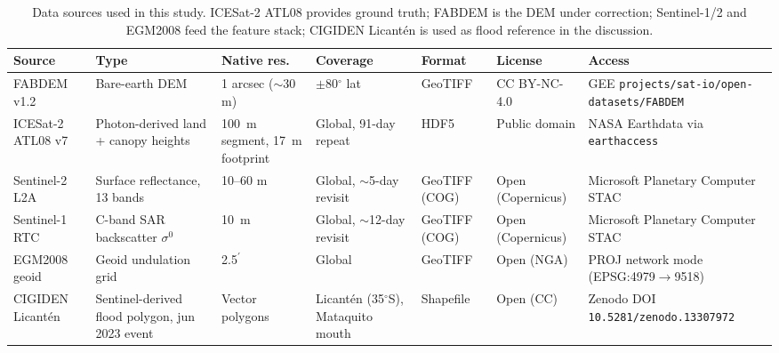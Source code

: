 \begin{table}[t]
\centering
\caption{Data sources used in this study. ICESat-2 ATL08 provides ground truth; FABDEM is the DEM under correction; Sentinel-1/2 and EGM2008 feed the feature stack; CIGIDEN Licant\'en is used as flood reference in the discussion.}
\label{tab:data_sources}
\footnotesize
\begin{tabular}{p{2.4cm}p{3cm}p{2cm}p{2cm}p{1.5cm}p{1.5cm}p{3cm}}
\toprule
\textbf{Source} & \textbf{Type} & \textbf{Native res.} & \textbf{Coverage} & \textbf{Format} & \textbf{License} & \textbf{Access} \\
\midrule
FABDEM v1.2 & Bare-earth DEM & 1 arcsec ($\sim$30 m) & $\pm$80$^{\circ}$ lat & GeoTIFF & CC BY-NC-4.0 & GEE \texttt{projects/sat-io/open-datasets/FABDEM} \\
ICESat-2 ATL08 v7 & Photon-derived land + canopy heights & 100~m segment, 17~m footprint & Global, 91-day repeat & HDF5 & Public domain & NASA Earthdata via \texttt{earthaccess} \\
Sentinel-2 L2A & Surface reflectance, 13 bands & 10--60 m & Global, $\sim$5-day revisit & GeoTIFF (COG) & Open (Copernicus) & Microsoft Planetary Computer STAC \\
Sentinel-1 RTC & C-band SAR backscatter $\sigma^{0}$ & 10~m & Global, $\sim$12-day revisit & GeoTIFF (COG) & Open (Copernicus) & Microsoft Planetary Computer STAC \\
EGM2008 geoid & Geoid undulation grid & 2.5$^{\prime}$ & Global & GeoTIFF & Open (NGA) & PROJ network mode (EPSG:4979$\rightarrow$9518) \\
CIGIDEN Licantén & Sentinel-derived flood polygon, jun 2023 event & Vector polygons & Licantén (35$^{\circ}$S), Mataquito mouth & Shapefile & Open (CC) & Zenodo DOI \texttt{10.5281/zenodo.13307972} \\
\bottomrule
\end{tabular}
\end{table}
